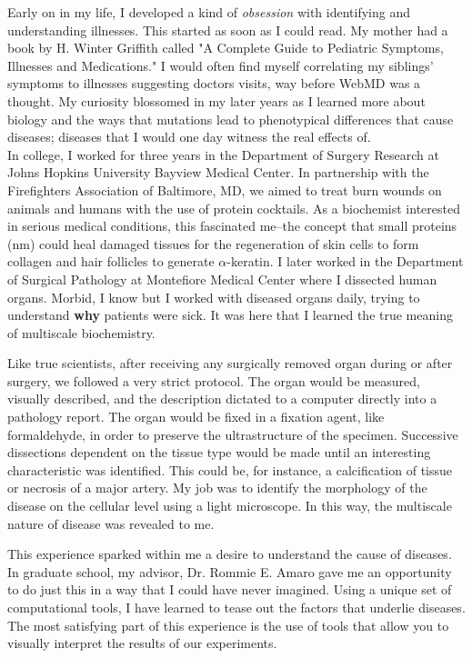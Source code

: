 \documentclass[12pt]{ucsddissertation}
\newcommand\tab[1][1cm]{\hspace*{#1}}
\begin{document}
\begin{preface}
\tab[0.7cm]Early on in my life, I developed a kind of \textit{obsession} with identifying and understanding illnesses. This started as soon as I could read. My mother had a book by H. Winter Griffith called "A Complete Guide to Pediatric Symptoms, Illnesses and Medications." I would often find myself correlating  my siblings' symptoms to illnesses suggesting doctors visits, way before WebMD was a thought. My curiosity blossomed in my later years as I learned more about biology and the ways that mutations lead to phenotypical differences that cause diseases; diseases that I would one day witness the real effects of.\\
\tab[0.7cm]In college, I worked for three years in the Department of Surgery Research at Johns Hopkins University Bayview Medical Center. In partnership with the Firefighters Association of Baltimore, MD, we aimed to treat burn wounds on animals and humans with the use of protein cocktails. As a biochemist interested in serious medical conditions, this fascinated me--the concept that small proteins (nm) could heal damaged tissues for the regeneration of skin cells to form collagen and hair follicles to generate $\alpha$-keratin. I later worked in the Department of Surgical Pathology at Montefiore Medical Center where I dissected human organs. Morbid, I know but I worked with diseased organs daily, trying to understand \textbf{why} patients were sick. It was here that I learned the true meaning of multiscale biochemistry. 

Like true scientists, after receiving any surgically removed organ during or after surgery, we followed a very strict protocol. The organ would be measured, visually described, and the description dictated to a computer directly into a pathology report. The organ would be fixed in a fixation agent, like formaldehyde, in order to preserve the ultrastructure of the specimen. Successive dissections dependent on the tissue type would be made until an interesting characteristic was identified. This could be, for instance, a calcification of tissue or necrosis of a major artery. My job was to identify the morphology of the disease on the cellular level using a light microscope. In this way, the multiscale nature of disease was revealed to me. 

This experience sparked within me a desire to understand the cause of diseases. In graduate school, my advisor, Dr. Rommie E. Amaro gave me an opportunity to do just this in a way that I could have never imagined. Using a unique set of computational tools, I have learned to tease out the factors that underlie diseases. The most satisfying part of this experience is the use of tools that allow you to visually interpret the results of our experiments. 

\end{preface}
\end{document}
